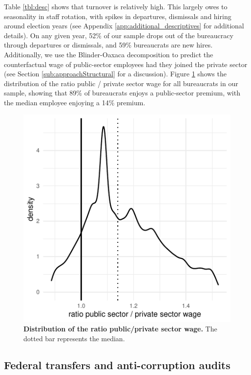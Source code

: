 Table \ref{tbl:desc} shows that turnover is relatively high. This largely owes to seasonality in staff rotation, with spikes in departures, dismissals and hiring around election years (see Appendix \ref{app:additional_descriptives} for additional details). On any given year, 52\% of our sample drops out of the bureaucracy through departures or dismissals, and 59\% bureaucrats are new hires. Additionally, we use the Blinder-Oaxaca decomposition \citep{blinder1973wage} to predict the counterfactual wage of public-sector employees had they joined the private sector (see Section \ref{sub:approachStructural} for a discussion). Figure \ref{fig:panel_summary} shows the distribution of the ratio public / private sector wage for all bureaucrats in our sample, showing that 89\% of bureaucrats enjoys a public-sector premium, with the median employee enjoying a 14\% premium. 

\begin{figure}[H]
    \centering
    \includegraphics{chapters/chapter_2/figures/sampleDistribwwb.pdf}
    \caption{{\bf Distribution of the ratio public/private sector wage.} The dotted bar represents the median.}
    \label{fig:panel_summary}
\end{figure}

\subsection{Federal transfers and anti-corruption audits}
\label{sub:audits}

